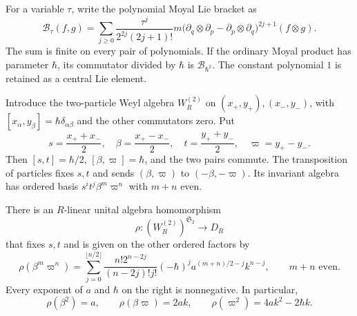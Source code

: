 For a variable $\tau$, write the polynomial Moyal Lie bracket as
\begin{equation}\label{mht:frgl:eq:quantum-squared-parameter}
 \mathcal B_\tau(f,g)=
 \sum_{j\geq0}\frac{\tau^j}{2^{2j}(2j+1)!}
 m\bigl(\partial_q\otimes\partial_p-
          \partial_p\otimes\partial_q\bigr)^{2j+1}
 (f\otimes g).
\end{equation}
The sum is finite on every pair of polynomials.  If the ordinary
Moyal product has parameter $\hbar$, its commutator divided by
$\hbar$ is $\mathcal B_{\hbar^2}$.  The constant polynomial $1$ is retained
as a central Lie element.

Introduce the two-particle Weyl algebra $W_R^{(2)}$ on
$(x_+,y_+),(x_-,y_-)$, with
$[x_\alpha,y_\beta]=\hbar\delta_{\alpha\beta}$ and the other
commutators zero.  Put
\[
 s=\frac{x_++x_-}{2},\quad \beta=\frac{x_+-x_-}{2},\quad
 t=\frac{y_++y_-}{2},\quad \varpi=y_+-y_-.
\]
Then $[s,t]=\hbar/2$, $[\beta,\varpi]=\hbar$, and the two pairs commute.
The transposition of particles fixes $s,t$ and sends
$(\beta,\varpi)$ to $(-\beta,-\varpi)$.  Its invariant algebra has ordered basis
$s^i t^j \beta^m \varpi^n$ with $m+n$ even.

\begin{lemma}\label{mht:frgl:lem:radial-restriction}
There is an $R$-linear unital algebra homomorphism
\[
 \rho:(W_R^{(2)})^{\mathfrak S_2}\longrightarrow D_R
\]
that fixes $s,t$ and is given on the other ordered factors by
\begin{equation}\label{mht:frgl:eq:radial-monomial}
 \rho(\beta^m \varpi^n)=
 \sum_{j=0}^{\lfloor n/2\rfloor}
 \frac{n!2^{n-2j}}{(n-2j)!j!}
 (-\hbar)^j a^{(m+n)/2-j} k^{n-j},
 \qquad m+n\text{ even}.
\end{equation}
Every exponent of $a$ and $\hbar$ on the right is nonnegative.
In particular,
\[
 \rho(\beta^2)=a,\qquad \rho(\beta\varpi)=2ak,\qquad
 \rho(\varpi^2)=4ak^2-2\hbar k.
\]
\end{lemma}

